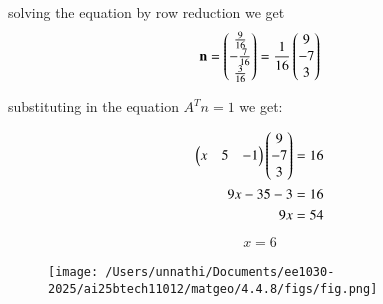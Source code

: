\documentclass[journal]{IEEEtran}
\begin{document}
solving the equation by row reduction we get 
\begin{align}
	\mathbf{n} = \begin{pmatrix}\frac{9}{16} \\ -\frac{7}{16} \\ \frac{3}{16}\end{pmatrix} = \frac{1}{16}\begin{pmatrix}9 \\ -7 \\ 3\end{pmatrix}
\end{align}

substituting in the equation $A^{T}n =1 $ we get:

\begin{align}
    \begin{pmatrix}x & 5 &-1\end{pmatrix}\begin{pmatrix}9\\-7\\3\end{pmatrix} = 16\\
    9x - 35 - 3 = 16 \\
    9x = 54
\end{align}
\begin{align}
    x = 6
\end{align}


\begin{figure}[h!]
   \centering
   \texttt{[image: /Users/unnathi/Documents/ee1030-2025/ai25btech11012/matgeo/4.4.8/figs/fig.png]}
   \caption{}
   \label{stemplot}
\end{figure}
\end{document}
